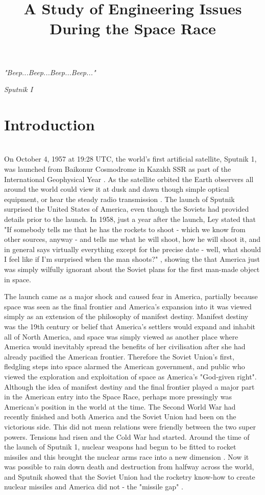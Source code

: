 \documentclass[10pt, journal]{IEEEtran}
\begin{document}
\title{A Study of Engineering Issues During the Space Race}
\author{
}
\maketitle

\epigraph{\textit{"Beep...Beep...Beep...Beep..."}}{\textit{Sputnik I}}
\section{Introduction}
~\\
On October 4, 1957 at 19:28 UTC, the world's first artificial satellite, Sputnik 1, was launched from Baikonur Cosmodrome in Kazakh SSR \cite{times1957} as part of the International Geophysical Year \cite{geoyear}. As the satellite orbited the Earth observers all around the world could view it at dusk and dawn though simple optical equipment, or hear the steady radio transmission \cite{radiosput}. The launch of Sputnik surprised the United States of America, even though the Soviets had provided details prior to the launch. In 1958, just a year after the launch, Ley stated that "If somebody tells me that he has the rockets to shoot - which we know from other sources, anyway - and tells me what he will shoot, how he will shoot it, and in general says virtually everything except for the precise date - well, what should I feel like if I'm surprised when the man shoots?" \cite{ley1958}, showing the that America just was simply wilfully ignorant about the Soviet plans for the first man-made object in space.

The launch came as a major shock and caused fear in America, partially because space was seen as the final frontier \cite{bellmusk} and America's expansion into it was viewed simply as an extension of the philosophy of manifest destiny\cite{washmani}. Manifest destiny was the 19th century or belief that America's settlers would expand and inhabit all of North America, and space was simply viewed as another place where America would inevitably spread the benefits of her civilisation \cite{merk1963} after she had already pacified the American frontier. Therefore the Soviet Union's first, fledgling steps into space alarmed the American government, and public who viewed the exploration and exploitation of space as America's "God-given right". Although the idea of manifest destiny and the final frontier played a major part in the American entry into the Space Race, perhaps more pressingly was American's position in the world at the time. The Second World War had recently finished and both America and the Soviet Union had been on the victorious side.  This did not mean relations were friendly between the two super powers. Tensions had risen and the Cold War had started. Around the time of the launch of Sputnik 1, nuclear weapons had begun to be fitted to rocket missiles and this brought the nuclear arms race into a new dimension \cite{bacon}. Now it was possible to rain down death and destruction from halfway across the world, and Sputnik showed that the Soviet Union had the rocketry know-how to create nuclear missiles and America did not - the "missile gap" \cite{missilegap}.
\end{document}

